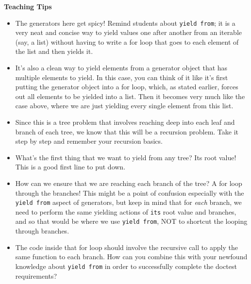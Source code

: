 \begin{blocksection}
\begin{guide}
\textbf{Teaching Tips}
\begin{itemize}
\item The generators here get spicy! Remind students about \texttt{yield from}; it is a very neat and concise way to yield values one after another from an iterable (say, a list) without having to write a for loop that goes to each element of the list and then yields it.
\item It's also a clean way to yield elements from a generator object that has multiple elements to yield. In this case, you can think of it like it's first putting the generator object into a for loop, which, as stated earlier, forces out all elements to be yielded into a list. Then it becomes very much like the case above, where we are just yielding every single element from this list.
\item Since this is a tree problem that involves reaching deep into each leaf and branch of each tree, we know that this will be a recursion problem. Take it step by step and remember your recursion basics.
\item What's the first thing that we want to yield from any tree? Its root value! This is a good first line to put down.
\item How can we ensure that we are reaching each branch of the tree? A for loop through the branches! This might be a point of confusion especially with the \texttt{yield from} aspect of generators, but keep in mind that for \textit{each} branch, we need to perform the same yielding actions of \texttt{its} root value and branches, and so that would be where we use \texttt{yield from}, NOT to shortcut the looping through branches.
\item The code inside that for loop should involve the recursive call to apply the same function to each branch. How can you combine this with your newfound knowledge about \texttt{yield from} in order to successfully complete the doctest requirements?
\end{itemize}
\end{guide}
\end{blocksection}
